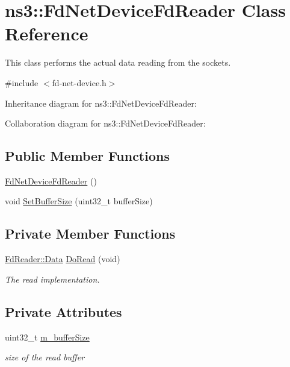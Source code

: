 \hypertarget{classns3_1_1FdNetDeviceFdReader}{}\section{ns3\+:\+:Fd\+Net\+Device\+Fd\+Reader Class Reference}
\label{classns3_1_1FdNetDeviceFdReader}


This class performs the actual data reading from the sockets.  




{\ttfamily \#include $<$fd-\/net-\/device.\+h$>$}



Inheritance diagram for ns3\+:\+:Fd\+Net\+Device\+Fd\+Reader\+:


Collaboration diagram for ns3\+:\+:Fd\+Net\+Device\+Fd\+Reader\+:
\subsection*{Public Member Functions}
\begin{DoxyCompactItemize}
\item 
\hyperlink{classns3_1_1FdNetDeviceFdReader_a0de5d6328ff506512d71764bf567abfa}{Fd\+Net\+Device\+Fd\+Reader} ()
\item 
void \hyperlink{classns3_1_1FdNetDeviceFdReader_a3de964a4bb9349d573febd3f0b14d8aa}{Set\+Buffer\+Size} (uint32\+\_\+t buffer\+Size)
\end{DoxyCompactItemize}
\subsection*{Private Member Functions}
\begin{DoxyCompactItemize}
\item 
\hyperlink{structns3_1_1FdReader_1_1Data}{Fd\+Reader\+::\+Data} \hyperlink{classns3_1_1FdNetDeviceFdReader_accdcf64286ebf82623e99c0073c933df}{Do\+Read} (void)
\begin{DoxyCompactList}\small\item\em The read implementation. \end{DoxyCompactList}\end{DoxyCompactItemize}
\subsection*{Private Attributes}
\begin{DoxyCompactItemize}
\item 
uint32\+\_\+t \hyperlink{classns3_1_1FdNetDeviceFdReader_a12388cd870f27e4b6b99525faf45a25e}{m\+\_\+buffer\+Size}
\begin{DoxyCompactList}\small\item\em size of the read buffer \end{DoxyCompactList}\end{DoxyCompactItemize}
